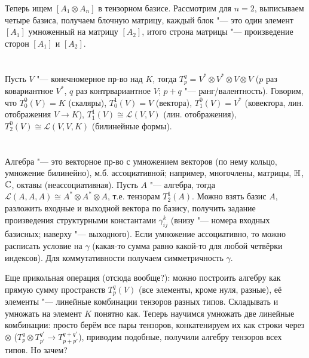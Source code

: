 Теперь ищем $[A_1 \otimes A_n]$ в тензорном базисе.
Рассмотрим для $n=2$, выписываем четыре базиса, получаем блочную матрицу, каждый блок "--- это один элемент $[A_1]$ умноженный
на матрицу $[A_2]$, итого строна матрицы "--- произведение сторон $[A_1]$ и $[A_2]$.

\section{} %
Пусть $V$ "--- конечномерное пр-во над $K$, тогда $T_p^q = V^*\otimes V^*\otimes V \otimes V$ ($p$ раз ковариантное $V^*$, $q$ раз контрвариантное $V$; $p+q$ "--- ранг/валентность).
Говорим, что $T_0^0(V)=K$ (скаляры), $T_0^1(V)=V$ (вектора), $T_1^0(V)=V^*$ (ковектора, лин. отображения $V \to K$), $T_1^1(V) \cong \mathcal L (V, V)$ (лин. отображения),
$T_2^0(V) \cong \mathcal L(V, V, K)$ (билинейные формы).

\section{} %

Алгебра "--- это векторное пр-во с умножением векторов (по нему кольцо, умножение билинейно), м.б. ассоциативной;
например, многочлены, матрицы, $\mathbb{H}$, $\mathbb{C}$, октавы (неассоциативная).
Пусть $A$ "--- алгебра, тогда $\mathcal L(A, A, A) \cong A^* \otimes A^* \otimes A$, т.е. тензорам $T_2^1(A)$.
Можно взять базис $A$, разложить входные и выходной вектора по базису, получить задание произведения структурными
константами $\gamma_{ij}^k$ (внизу "--- номера входных базисных; наверху "--- выходного).
Если умножение ассоциативно, то можно расписать условие на $\gamma$ (какая-то сумма равно какой-то для любой четвёрки индексов).
Для коммутативности получаем симметричность $\gamma$.

Еще прикольная операция (отсюда вообще?): можно построить алгебру как прямую сумму пространств $T_p^q(V)$ (все элементы, кроме нуля, разные),
её элементы "--- линейные комбинации тензоров разных типов.
Складывать и умножать на элемент $K$ понятно как.
Теперь научимся умножать две линейные комбинации: просто берём все пары тензоров, конкатенируем их как строки через $\otimes$ ($T_p^q \otimes T_{p'}^{q'} \to T_{p+p'}^{q+q'}$),
приводим подобные, получили алгебру тензоров всех типов.
Но зачем?

\section{} %

\section{} %
